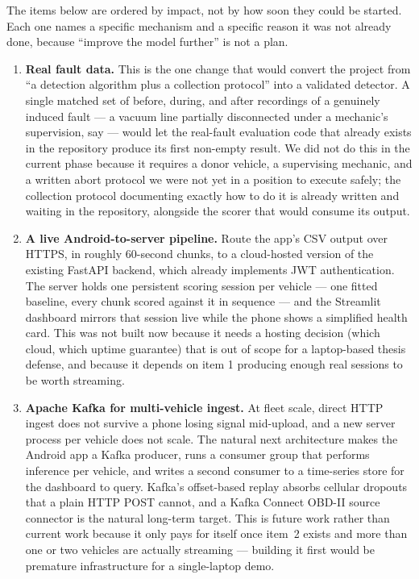 The items below are ordered by impact, not by how soon they could be
started. Each one names a specific mechanism and a specific reason it was
not already done, because ``improve the model further'' is not a plan.

\begin{enumerate}
  \item \textbf{Real fault data.} This is the one change that would convert
    the project from ``a detection algorithm plus a collection protocol''
    into a validated detector. A single matched set of before, during, and
    after recordings of a genuinely induced fault --- a vacuum line
    partially disconnected under a mechanic's supervision, say --- would let
    the real-fault evaluation code that already exists in the repository
    produce its first non-empty result. We did not do this in the current phase
    because it requires a donor vehicle, a supervising mechanic, and a
    written abort protocol we were not yet in a position to execute safely;
    the collection protocol documenting exactly how to do it is already
    written and waiting in the repository, alongside the scorer that would
    consume its output.

  \item \textbf{A live Android-to-server pipeline.} Route the app's CSV
    output over HTTPS, in roughly 60-second chunks, to a cloud-hosted
    version of the existing FastAPI backend, which already implements JWT
    authentication. The server holds one persistent scoring session per
    vehicle --- one fitted baseline, every chunk scored against it in
    sequence --- and the Streamlit dashboard mirrors that session live
    while the phone shows a simplified health card. This was not built now
    because it needs a hosting decision (which cloud, which uptime
    guarantee) that is out of scope for a laptop-based thesis defense, and
    because it depends on item 1 producing enough real sessions to be
    worth streaming.

  \item \textbf{Apache Kafka for multi-vehicle ingest.} At fleet scale,
    direct HTTP ingest does not survive a phone losing signal mid-upload,
    and a new server process per vehicle does not scale. The natural next
    architecture makes the Android app a Kafka producer, runs a consumer
    group that performs inference per vehicle, and writes a second consumer
    to a time-series store for the dashboard to query. Kafka's offset-based
    replay absorbs cellular dropouts that a plain HTTP POST cannot, and a
    Kafka Connect OBD-II source connector is the natural long-term target.
    This is future work rather than current work because it only pays for
    itself once item~2 exists and more than one or two vehicles are
    actually streaming --- building it first would be premature
    infrastructure for a single-laptop demo.


\end{enumerate}
